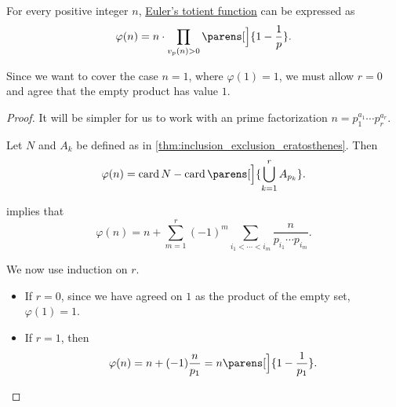 \begin{theorem}\label{thm:totient_function_product_formula}
  For every positive integer \( n \), \hyperref[def:eulers_totient_function]{Euler's totient function} can be expressed as
  \begin{equation}\label{eq:thm:totient_function_product_formula}
    \varphi(n) = n \cdot \prod_{v_p(n) > 0} \parens[\Big]{ 1 - \frac 1 p }.
  \end{equation}
\end{theorem}
\begin{comments}
  \item Since we want to cover the case \( n = 1 \), where \( \varphi(1) = 1 \), we must allow \( r = 0 \) and agree that the empty product has value \( 1 \).
\end{comments}
\begin{proof}
  It will be simpler for us to work with an prime factorization \( n = p_1^{a_1} \cdots p_r^{a_r} \).

  Let \( N \) and \( A_k \) be defined as in \cref{thm:inclusion_exclusion_eratosthenes}. Then
  \begin{equation*}
    \varphi(n) = \card N - \card\parens[\Big]{ \bigcup_{k=1}^r A_{p_k} }.
  \end{equation*}

   implies that
  \begin{equation}\label{eq:thm:totient_function_product_formula/intermediate}
    \varphi(n) = n + \sum_{m=1}^r (-1)^m \sum_{i_1 < \cdots < i_m} \frac n {p_{i_1} \cdots p_{i_m}}.
  \end{equation}

  We now use induction on \( r \).
  \begin{itemize}
    \item If \( r = 0 \), since we have agreed on \( 1 \) as the product of the empty set, \( \varphi(1) = 1 \).
    \item If \( r = 1 \), then
    \begin{equation*}
      \varphi(n) = n + (-1) \frac n {p_1} = n \parens[\Big]{ 1 - \frac 1 {p_1} }.
    \end{equation*}


\end{itemize}
\end{proof}
